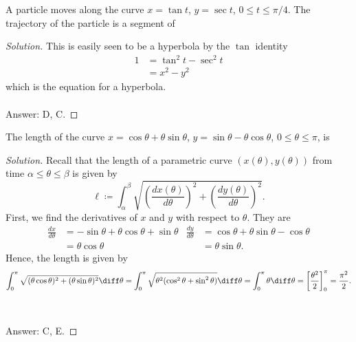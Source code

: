 \begin{problem}
A particle moves along  the curve $x=\tan t$, $y=\sec t$, $0\leq t\leq
\pi/4$. The trajectory of the particle is a segment of
\end{problem}
\begin{proof}[Solution]
This is easily seen to be a hyperbola by the $\tan$ identity
\begin{align*}
1&=\tan^2t-\sec^2t\\
 &=x^2-y^2
\end{align*}
which is the equation for a hyperbola.
\\\\
Answer: {\color{Green}D}, {\color{Red}C}.
\end{proof}

\begin{problem}
The length of the curve $x=\cos\theta+\theta\sin\theta$,
$y=\sin\theta-\theta\cos\theta$, $0\leq\theta\leq\pi$, is
\end{problem}
\begin{proof}[Solution]
Recall that the length of a parametric curve $(x(\theta),y(\theta))$ from
time $\alpha\leq\theta\leq\beta$ is given by
\[
\ell\coloneqq\int_\alpha^\beta\sqrt{\left(\frac{dx(\theta)}{d\theta}\right)^2+
\left(\frac{dy(\theta)}{d\theta}\right)^2}.
\]
First, we find the derivatives of $x$ and $y$ with respect to
$\theta$. They are
\begin{align*}
\frac{dx}{d\theta}
&=-\sin\theta+\theta\cos\theta+\sin\theta&
\frac{dy}{d\theta}
&=\cos\theta+\theta\sin\theta-\cos\theta\\
&=\theta\cos\theta&&=\theta\sin\theta.
\end{align*}
Hence, the length is given by
\[
\int_0^\pi\sqrt{(\theta\cos\theta)^2+(\theta\sin\theta)^2}\diff\theta=
\int_0^\pi\sqrt{\theta^2(\cos^2\theta+\sin^2\theta)}\diff\theta=
\int_0^\pi\theta\diff\theta=\left[\frac{\theta^2}{2}\right]_0^\pi=\frac{\pi^2}{2}.
\]
\\\\
Answer: {\color{Green}C}, {\color{Red}E}.
\end{proof}

